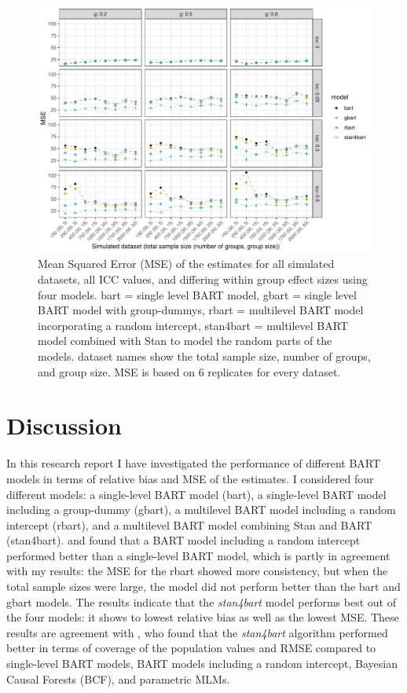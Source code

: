 \documentclass[10pt, a4paper, titlepage]{article}
\begin{document}
\begin{figure}[H]
\caption{Mean Squared Error (MSE) of the estimates for all simulated datasets, all ICC values, and differing within group effect sizes using four models. bart = single level BART model, gbart = single level BART model with group-dummys, rbart = multilevel BART model incorporating a random intercept, stan4bart = multilevel BART model combined with Stan to model the random parts of the models. dataset names show the total sample size, number of groups, and group size. MSE is based on 6 replicates for every dataset.}
\centering
\label{fig:mseplots}
\includegraphics[width=\textwidth]{mseplots4.pdf}
\end{figure}

\newpage
\section{Discussion}

In this research report I have investigated the performance of different BART models in terms of relative bias and MSE of the estimates. I considered four different models: a single-level BART model (bart), a single-level BART model including a group-dummy (gbart), a multilevel BART model including a random intercept (rbart), and a multilevel BART model combining Stan and BART (stan4bart). \citet{chen2020, tan2016} and \citet{wundervald2022} found that a BART model including a random intercept performed better than a single-level BART model, which is partly in agreement with my results: the MSE for the rbart showed more consistency, but when the total sample sizes were large, the model did not perform better than the bart and gbart models. The results indicate that the \textit{stan4bart} model performs best out of the four models: it shows to lowest relative bias as well as the lowest MSE. These results are agreement with \citet{dorie2022}, who found that the \textit{stan4bart} algorithm performed better in terms of coverage of the population values and RMSE compared to single-level BART models, BART models including a random intercept, Bayesian Causal Forests (BCF), and parametric MLMs.
\end{document}
